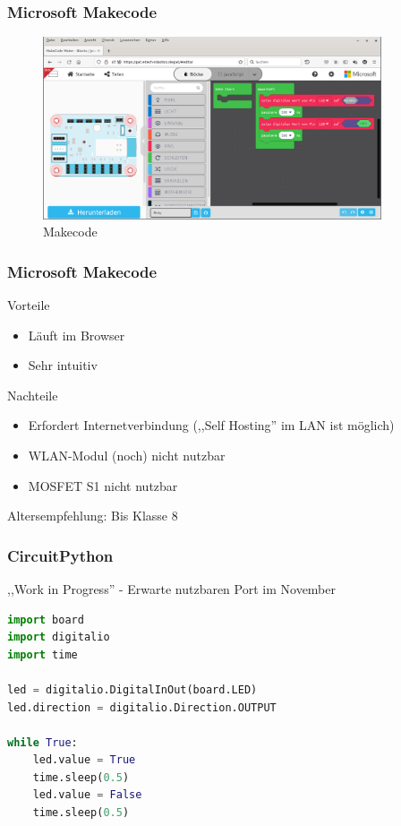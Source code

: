 \documentclass{beamer}
\begin{document}
\begin{frame}
\frametitle{Microsoft Makecode}

 \begin{figure}
  \includegraphics[width=10cm]{makecode.png}
  \caption{Makecode}
  \label{fig:makecode}
  \end{figure}

\end{frame}

\begin{frame}
\frametitle{Microsoft Makecode}

Vorteile

\begin{itemize}
\item Läuft im Browser
\item Sehr intuitiv 
\end{itemize}

Nachteile 

\begin{itemize}
\item Erfordert Internetverbindung (,,Self Hosting'' im LAN ist möglich)
\item WLAN-Modul (noch) nicht nutzbar 
\item MOSFET S1 nicht nutzbar
\end{itemize}

Altersempfehlung: Bis Klasse 8 

\end{frame}

\begin{frame}[fragile]

\frametitle{CircuitPython}

,,Work in Progress'' - Erwarte nutzbaren Port im November

\begin{lstlisting}[language=Python] 
import board
import digitalio
import time

led = digitalio.DigitalInOut(board.LED)
led.direction = digitalio.Direction.OUTPUT

while True:
    led.value = True
    time.sleep(0.5)
    led.value = False
    time.sleep(0.5)
\end{lstlisting} 
\end{frame}
\end{document}
